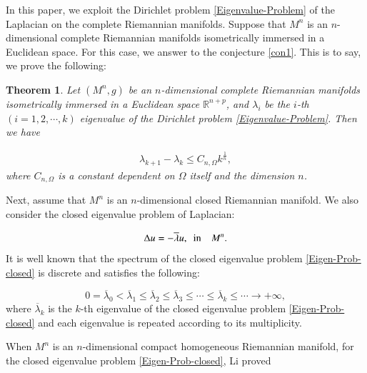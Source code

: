 \documentclass[12pt]{article}
\newtheorem{thm}{Theorem}[section]
\numberwithin{equation}{section}
\begin{document}
In this paper, we exploit the Dirichlet problem \eqref{Eigenvalue-Problem} of the Laplacian on the complete Riemannian manifolds.
Suppose that $M^{n}$ is an $n$-dimensional complete Riemannian manifolds isometrically
immersed in a Euclidean space. For this case, we answer to the conjecture \ref{con1}. This is to say, we prove the
following:

\begin{thm}
\label{thm1.1}Let $(M^{n},g)$ be  an $n$-dimensional complete Riemannian manifolds isometrically
immersed in a Euclidean space $\mathbb{R}^{n+p}$, and $\lambda_{i}$ be the $i$-th $(i=1,2,\cdots,k)$
eigenvalue of the Dirichlet problem \eqref{Eigenvalue-Problem}. Then we have


\begin{equation}\label{z1}\begin{aligned}\lambda_{k+1}-\lambda_{k}\leq
C_{n,\Omega}k^{\frac{1}{n}},\end{aligned}
\end{equation}
where $C_{n,\Omega}$ is a constant dependent on $\Omega$ itself and the dimension $n$.
\end{thm}
Next, assume that $M^{n}$ is an $n$-dimensional closed Riemannian manifold. We also consider the closed eigenvalue problem of Laplacian:

\begin{equation}
 \label{Eigen-Prob-closed}\Delta u=-\overline{\lambda} u,\ \ {\rm
in}\ \ \ \ M^{n}.\end{equation}
It is well known that the spectrum of the closed eigenvalue problem  \eqref{Eigen-Prob-closed}  is
discrete and satisfies the following:

\begin{equation*}
0=\overline{\lambda}_{0}<\overline{\lambda}_{1}\leq\overline{\lambda}_{2}\leq\overline{\lambda}_{3}\leq\cdots\leq\overline{\lambda}_{k}\leq\cdots\rightarrow+\infty,
\end{equation*}
where $\overline{\lambda}_{k}$ is the $k$-th eigenvalue of the closed eigenvalue problem \eqref{Eigen-Prob-closed} and each eigenvalue is repeated according to its multiplicity.


When $M^{n}$ is an $n$-dimensional compact homogeneous Riemannian manifold, for the closed eigenvalue problem \eqref{Eigen-Prob-closed}, Li\cite{L} proved
\end{document}
